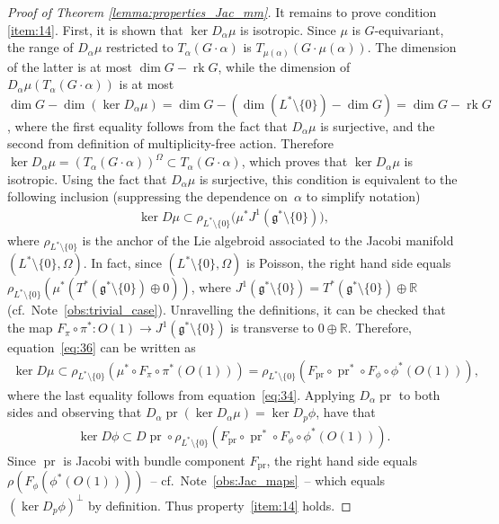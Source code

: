 \documentclass[pdftex]{sigma}
\numberwithin{equation}{section}
\newcommand{\CM}{(M,H)} %
\newcommand{\SYM}{L^* \setminus \{0\}} %
\newcommand{\RR}{\mathbb{R}}
\begin{document}
\begin{proof}[Proof of Theorem \ref{lemma:properties_Jac_mm}]
It remains to prove condition \ref{item:14}. First, it is shown that $\ker D_{\alpha}\mu$ is isotropic. Since $\mu $ is $G$-equivariant, the range of $D_{\alpha} \mu$ restricted to $T_{\alpha}(G \cdot \alpha)$ is $T_{\mu(\alpha)} (G \cdot \mu(\alpha))$. The dimension of the latter is at most $\dim G - \operatorname{rk} G$, while the dimension of $D_{\alpha} \mu (T_{\alpha} (G \cdot \alpha))$ is at most $\dim G - \dim (\ker D_{\alpha}\mu) = \dim G - (\dim (L^* \setminus \{0\}) - \dim G) = \dim G - \operatorname{rk} G$, where the f\/irst equality follows from the fact that $D_{\alpha}\mu$ is surjective, and the second from def\/inition of multiplicity-free action. Therefore $\ker D_{\alpha} \mu =(T_{\alpha} (G \cdot \alpha))^{\Omega} \subset T_{\alpha}(G \cdot \alpha)$, which proves that $\ker D_{\alpha} \mu$ is isotropic. Using the fact that $D_{\alpha} \mu$ is surjective, this condition is equivalent to the following inclusion (suppressing the dependence on~$\alpha$ to simplify notation)
\begin{gather} \label{eq:36}
 \ker D \mu \subset \rho_{L^{*} \setminus \{0\}} \big(\mu^*J^1(\mathfrak{g}^* \setminus \{0\})\big),
\end{gather}
where $\rho_{L^{*} \setminus \{0\}}$ is the anchor of the Lie algebroid associated to the Jacobi manifold $(\SYM,\Omega)$. In fact, since
$(\SYM,\Omega)$ is Poisson, the right hand side equals $ \rho_{L^{*} \setminus \{0\}} (\mu^*( T^*(\mathfrak{g}^* \setminus \{0\}) \oplus 0))$, where $J^1(\mathfrak{g}^* \setminus \{0\}) = T^*(\mathfrak{g}^* \setminus \{0\}) \oplus \RR$ (cf.\ Note~\ref{obs:trivial_case}). Unravelling the def\/initions, it can be checked that the map $F_{\pi} \circ \pi^* \colon O(1) \to J^1(\mathfrak{g}^* \setminus \{0\})$ is transverse to $0 \oplus \RR$. Therefore, equation~\eqref{eq:36} can be written as
\begin{gather*}
 \ker D \mu \subset \rho_{L^{*} \setminus \{0\}} (\mu^*\circ F_{\pi} \circ \pi^*(O(1)))= \rho_{L^{*} \setminus \{0\}}(F_{\operatorname{pr}} \circ
 \operatorname{pr}^* \circ F_{\phi} \circ \phi^*(O(1)) ),
\end{gather*}
where the last equality follows from equation~\eqref{eq:34}. Applying $D_{\alpha} \operatorname{pr}$ to both sides and observing that $D_{\alpha} \operatorname{pr} (\ker D_{\alpha} \mu) = \ker D_p \phi$, have that
 \begin{gather*}
 \ker D \phi \subset D \operatorname{pr} \circ \rho_{L^{*} \setminus \{0\}} (F_{\operatorname{pr}} \circ \operatorname{pr}^* \circ F_{\phi} \circ \phi^*(O(1)) ).
 \end{gather*}
Since $\operatorname{pr}$ is Jacobi with bundle component $F_{\operatorname{pr}}$, the right hand side equals
 $\rho(F_{\phi}(\phi^*(O(1))))$~-- cf.\ Note~\ref{obs:Jac_maps}~-- which equals $(\ker D_p \phi)^{\perp}$ by def\/inition. Thus property~\ref{item:14} holds.
\end{proof}
\end{document}
